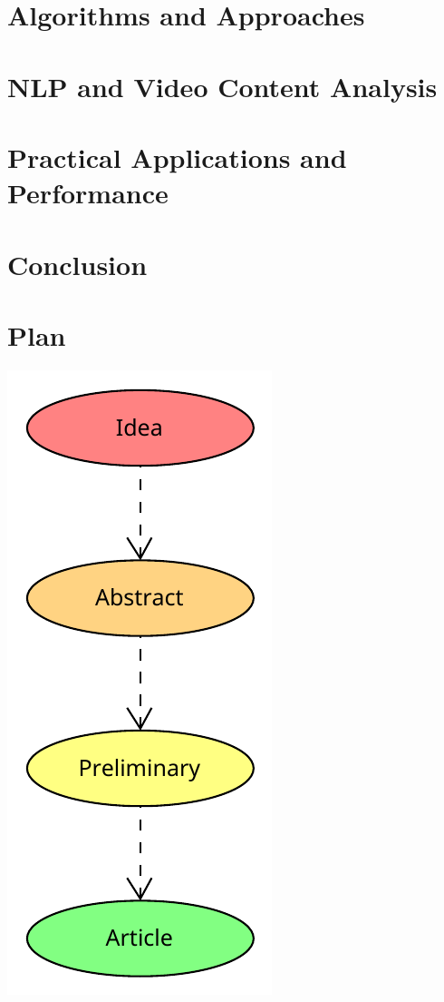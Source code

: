 \documentclass[12pt,english,a4paper]{article}
\begin{document}
\section{Algorithms and Approaches}

\section{NLP and Video Content Analysis}

\section{Practical Applications and Performance}

\section{Conclusion}

\section{Plan}
\begin{center}
    \includegraphics[scale=1,]{Plan.pdf}
\end{center}
\end{document}
